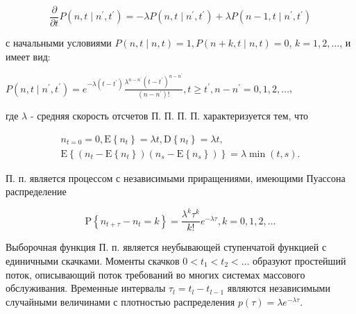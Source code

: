 \documentclass[10pt]{article}
\begin{document}
\[

\frac{\partial}{\partial t} P\left(n, t \mid n^{\prime}, t^{\prime}\right)=-\lambda P\left(n, t \mid n^{\prime}, t^{\prime}\right)+\lambda P\left(n-1, t \mid n^{\prime}, t^{\prime}\right)

\]



с начальными условиями $P(n, t \mid n, t)=1, P(n+k, t \mid n, t)=0$, $k=1,2, \ldots$, и имеет вид:



$P\left(n, t \mid n^{\prime}, t^{\prime}\right)=e^{-\lambda\left(t-t^{\prime}\right)} \frac{\lambda^{n-n^{\prime}}\left(t-t^{\prime}\right)^{n-n^{\prime}}}{\left(n-n^{\prime}\right) !}, t \geqslant t^{\prime}, n-n^{\prime}=0,1,2, \ldots$,



где $\lambda$ - средняя скорость отсчетов П. П. П. П. характеризуется тем, что



\[

\begin{gathered}

n_{t=0}=0, \mathrm{E}\left\{n_{t}\right\}=\lambda t, \mathrm{D}\left\{n_{t}\right\}=\lambda t, \\

\mathrm{E}\left\{\left(n_{t}-\mathrm{E}\left\{n_{t}\right\}\right)\left(n_{s}-\mathrm{E}\left\{n_{s}\right\}\right)\right\}=\lambda \min (t, s) .

\end{gathered}

\]



П. п. является процессом с независимыми приращениями, имеющими Пуассона распределение



\[

\mathrm{P}\left\{n_{t+\tau}-n_{t}=k\right\}=\frac{\lambda^{k} \tau^{k}}{k !} e^{-\lambda \tau}, k=0,1,2, \ldots

\]



Выборочная функция П. п. является неубывающей ступенчатой функцией с единичными скачками. Моменты скачков $0<t_{1}<t_{2}<\ldots$ образуют простейший поток, описывающий поток требований во многих системах массового обслуживания. Временные интервалы $\tau_{l}=t_{l}-t_{l-1}$ являются независимыми случайными величинами с плотностью распределения $p(\tau)=\lambda e^{-\lambda \tau}$.
\end{document}
